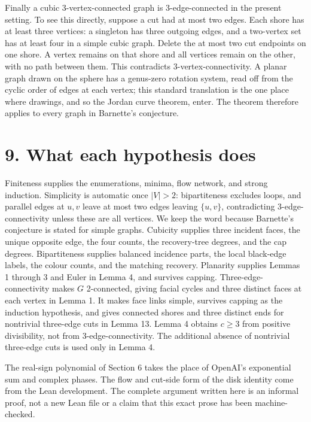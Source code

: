 \documentclass[a4paper,11pt]{amsart}
\begin{document}
Finally a cubic 3-vertex-connected graph is 3-edge-connected in the present setting. To see this directly, suppose a cut had at most two edges. Each shore has at least three vertices: a singleton has three outgoing edges, and a two-vertex set has at least four in a simple cubic graph. Delete the at most two cut endpoints on one shore. A vertex remains on that shore and all vertices remain on the other, with no path between them. This contradicts 3-vertex-connectivity. A planar graph drawn on the sphere has a genus-zero rotation system, read off from the cyclic order of edges at each vertex; this standard translation is the one place where drawings, and so the Jordan curve theorem, enter. The theorem therefore applies to every graph in Barnette's conjecture.

\section*{9. What each hypothesis does}

Finiteness supplies the enumerations, minima, flow network, and strong induction. Simplicity is automatic once $|V|>2$: bipartiteness excludes loops, and parallel edges at $u,\allowbreak v$ leave at most two edges leaving $\{u,\allowbreak v\}$, contradicting 3-edge-connectivity unless these are all vertices. We keep the word because Barnette's conjecture is stated for simple graphs. Cubicity supplies three incident faces, the unique opposite edge, the four counts, the recovery-tree degrees, and the cap degrees. Bipartiteness supplies balanced incidence parts, the local black-edge labels, the colour counts, and the matching recovery. Planarity supplies Lemmas 1 through 3 and Euler in Lemma 4, and survives capping. Three-edge-connectivity makes $G$ 2-connected, giving facial cycles and three distinct faces at each vertex in Lemma 1. It makes face links simple, survives capping as the induction hypothesis, and gives connected shores and three distinct ends for nontrivial three-edge cuts in Lemma 13. Lemma 4 obtains $c\ge3$ from positive divisibility, not from 3-edge-connectivity. The additional absence of nontrivial three-edge cuts is used only in Lemma 4.

The real-sign polynomial of Section 6 takes the place of OpenAI's exponential sum and complex phases. The flow and cut-side form of the disk identity come from the Lean development. The complete argument written here is an informal proof, not a new Lean file or a claim that this exact prose has been machine-checked.
\end{document}
